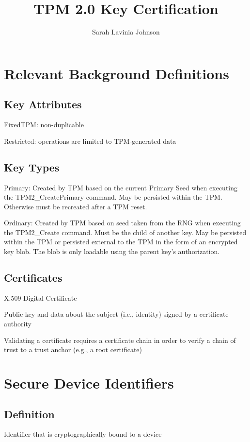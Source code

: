 \documentclass{article}
\title{TPM 2.0 Key Certification}
\author{Sarah Lavinia Johnson}
\begin{document}
\maketitle

\section*{Relevant Background Definitions}
\subsection*{Key Attributes}
FixedTPM: non-duplicable 

Restricted: operations are limited to TPM-generated data

\subsection*{Key Types}
Primary: Created by TPM based on the current Primary Seed when executing the TPM2\_CreatePrimary command. May be persisted within the TPM. Otherwise must be recreated after a TPM reset.

Ordinary: Created by TPM based on seed taken from the RNG when executing the TPM2\_Create command. Must be the child of another key. May be persisted within the TPM or persisted external to the TPM in the form of an encrypted key blob. The blob is only loadable using the parent key's authorization.

\subsection*{Certificates}
X.509 Digital Certificate

Public key and data about the subject (i.e., identity) signed by a certificate authority

Validating a certificate requires a certificate chain in order to verify a chain of trust to a trust anchor (e.g., a root certificate)







\section*{Secure Device Identifiers}
\subsection*{Definition}
Identifier that is cryptographically bound to a device
\end{document}
